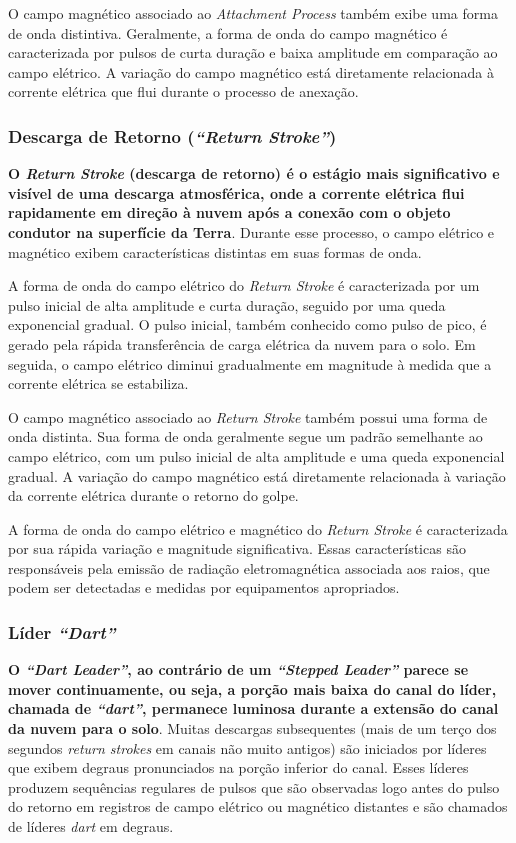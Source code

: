 \documentclass[a4paper, 12pt, onecolumn,singlespacing]{article}
\begin{document}
		O campo magnético associado ao \textit{Attachment Process} também exibe uma forma de onda distintiva. Geralmente, a forma de onda do campo magnético é caracterizada por pulsos de curta duração e baixa amplitude em comparação ao campo elétrico. A variação do campo magnético está diretamente relacionada à corrente elétrica que flui durante o processo de anexação.
	
	\subsubsection{Descarga de Retorno (\textit{``Return Stroke''})}
		\textbf{O \textit{Return Stroke} (descarga de retorno) é o estágio mais significativo e visível de uma descarga atmosférica, onde a corrente elétrica flui rapidamente em direção à nuvem após a conexão com o objeto condutor na superfície da Terra}. Durante esse processo, o campo elétrico e magnético exibem características distintas em suas formas de onda.
		
		A forma de onda do campo elétrico do \textit{Return Stroke} é caracterizada por um pulso inicial de alta amplitude e curta duração, seguido por uma queda exponencial gradual. O pulso inicial, também conhecido como pulso de pico, é gerado pela rápida transferência de carga elétrica da nuvem para o solo. Em seguida, o campo elétrico diminui gradualmente em magnitude à medida que a corrente elétrica se estabiliza.
		
		O campo magnético associado ao \textit{Return Stroke} também possui uma forma de onda distinta. Sua forma de onda geralmente segue um padrão semelhante ao campo elétrico, com um pulso inicial de alta amplitude e uma queda exponencial gradual. A variação do campo magnético está diretamente relacionada à variação da corrente elétrica durante o retorno do golpe.
		
		A forma de onda do campo elétrico e magnético do \textit{Return Stroke} é caracterizada por sua rápida variação e magnitude significativa. Essas características são responsáveis pela emissão de radiação eletromagnética associada aos raios, que podem ser detectadas e medidas por equipamentos apropriados.
	
	\subsubsection{Líder \textit{``Dart''}}
	
		\textbf{O \textit{``Dart Leader''}, ao contrário de um \textit{``Stepped Leader''} parece se mover continuamente, ou seja, a porção mais baixa do canal do líder, chamada de \textit{``dart''}, permanece luminosa durante a extensão do canal da nuvem para o solo}. Muitas descargas subsequentes (mais de um terço dos segundos \textit{return strokes} em canais não muito antigos) são iniciados por líderes que exibem degraus pronunciados na porção inferior do canal. Esses líderes produzem sequências regulares de pulsos que são observadas logo antes do pulso do retorno em registros de campo elétrico ou magnético distantes e são chamados de líderes \textit{dart} em degraus.
	
\end{document}
